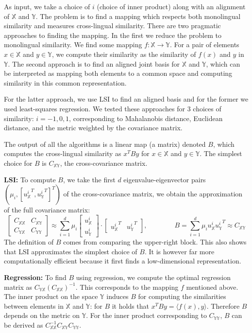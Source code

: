 \documentclass{article} %
\newcommand{\X}{\mathbb{X}}
\newcommand{\Y}{\mathbb{Y}}
\begin{document}
As input, we take a choice of $i$ (choice of inner product) along
with an alignment of $\X$ and $\Y$. The problem is to find a
mapping which respects both monolingual similarity and measures
cross-lingual similarity.  There are two pragmatic approaches to finding the mapping. In the
first we reduce the problem to monolingual similarity. We
find some mapping $f: \X \rightarrow \Y$. For a pair of elements
$x\in\X$ and $y\in\Y$, we compute their similarity as the
similarity of $f(x)$ and $y$ in $\Y$. The second approach is to
find an aligned joint basis for $\X$ and $\Y$, which can be
interpreted as mapping both elements to a common space and
computing similarity in this common representation.

For the latter approach, we use LSI to find an aligned basis and
for the former we used least-squares regression. We tested these
approaches for 3 choices of similarity: $i=-1,0,1$, corresponding
to Mahalanobis distance, Euclidean distance, and the metric
weighted by the covariance matrix.

The output of all the algorithms is a linear map (a matrix)
denoted $B$, which computes the cross-lingual similarity as $x^T B
y$ for $x\in\X$ and $y \in \Y$. The simplest choice for $B$ is
$C_{\X\Y}$, the cross-covariance matrix.

{\bf LSI:} To compute $B$, we take the first $d$
eigenvalue-eigenvector pairs $\left(\mu_i, [{u_\X^i}^T,
  {u_\Y^i}^T]^T\right)$ of the cross-covariance matrix, we obtain the approximation of the full
covariance matrix:
\begin{equation}
\begin{bmatrix}
  C_{\X \X} & C_{\X \Y} \\
  C_{\Y \X} & C_{\Y \Y}
\end{bmatrix} \approx \sum_{i = 1}^d \mu_i \begin{bmatrix} u_\X^i \\ u_\Y^i \end{bmatrix} \cdot \begin{bmatrix} {u_\X^i}^T & {u_\Y^i}^T \end{bmatrix}, \qquad \qquad B = \sum_{i = 1}^d \mu_i u_\X^i {u_\Y^i}^T\approx C_{\X \Y}
\end{equation}
The definition of $B$ comes from comparing the upper-right
block. This also shows that LSI approximates the simplest choice
of $B$. It is however far more computationally efficient because
it first finds a low-dimensional representation.

{\bf Regression:} To find $B$ using regression, we compute the
optimal regression matrix as $ C_{\Y \X} (C_{\X \X})^{-1}$. This
corresponds to the mapping $f$ mentioned above.  The inner
product on the space $\Y$ induces $B$ for computing the
similarities between elements in $\X$ and $\Y$: for $B$ it holds
that $x^T B y = \langle f (x), y \rangle$. Therefore $B$ depends
on the metric on $\Y$. For the inner product corresponding to
$C_{\Y\Y}$, $B$ can be derived as $C_{\X \X}^{-1}C_{\X
  \Y}C_{\Y \Y}$.
\end{document}
